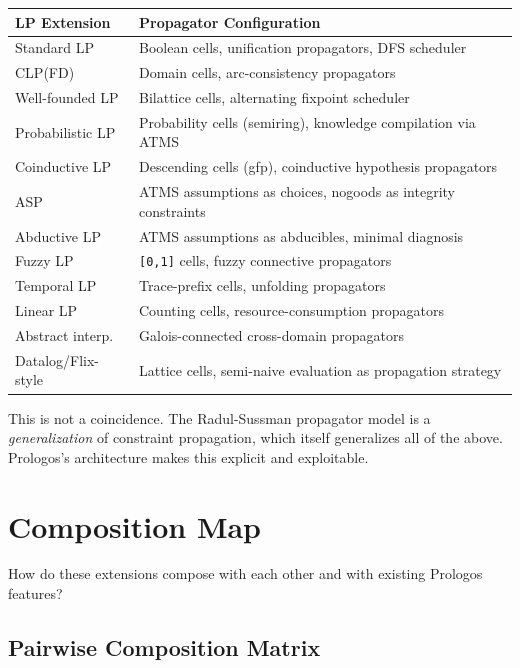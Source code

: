 \documentclass[11pt]{article}
\begin{document}
\begin{center}
\begin{tabular}{ll}
LP Extension & Propagator Configuration\\
\hline
Standard LP & Boolean cells, unification propagators, DFS scheduler\\
CLP(FD) & Domain cells, arc-consistency propagators\\
Well-founded LP & Bilattice cells, alternating fixpoint scheduler\\
Probabilistic LP & Probability cells (semiring), knowledge compilation via ATMS\\
Coinductive LP & Descending cells (gfp), coinductive hypothesis propagators\\
ASP & ATMS assumptions as choices, nogoods as integrity constraints\\
Abductive LP & ATMS assumptions as abducibles, minimal diagnosis\\
Fuzzy LP & \texttt{[0,1]} cells, fuzzy connective propagators\\
Temporal LP & Trace-prefix cells, unfolding propagators\\
Linear LP & Counting cells, resource-consumption propagators\\
Abstract interp. & Galois-connected cross-domain propagators\\
Datalog/Flix-style & Lattice cells, semi-naive evaluation as propagation strategy\\
\end{tabular}
\end{center}

This is not a coincidence. The Radul-Sussman propagator model is a
\emph{generalization} of constraint propagation, which itself generalizes all of
the above. Prologos's architecture makes this explicit and exploitable.
\section{Composition Map}
\label{sec:orgd8adb2c}

How do these extensions compose with each other and with existing Prologos features?
\subsection{Pairwise Composition Matrix}
\label{sec:org03fda05}
\end{document}
